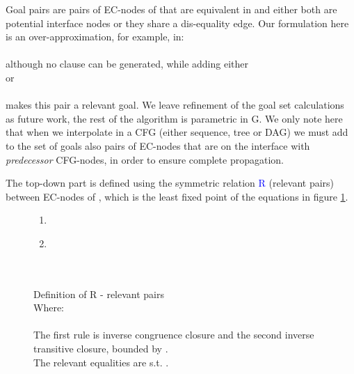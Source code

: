 \noindent
Goal pairs are pairs of EC-nodes of  that are equivalent in \eqg and either both are potential interface nodes or they share a dis-equality edge.
Our formulation here is an over-approximation, for example, in:\\
\\
 although no clause can be generated, while adding either\\
 or\\
\\
makes this pair a relevant goal.
We leave refinement of the goal set calculations as future work, the rest of the algorithm is parametric in G.
We only note here that when we interpolate in a CFG (either sequence, tree or DAG) we must add to the set of goals also pairs of EC-nodes that are on the interface with \emph{predecessor} CFG-nodes, in order to ensure complete propagation.

\noindent
The top-down part is defined using the symmetric relation \textcolor{blue}{R} (relevant pairs) between EC-nodes of , which is the least fixed point of the equations in figure \ref{R_def}.

\begin{figure}
\begin{enumerate}
	\item {}\\
	\item {}\\
	\\
	\\
\end{enumerate}
\caption{Definition of R - relevant pairs\\
Where:\\
\\
The first rule is inverse congruence closure and the second inverse transitive closure, bounded by \eqg.\\
The relevant equalities are  s.t. .
}
\label{R_def}
\end{figure}


